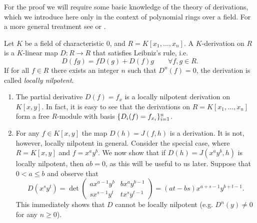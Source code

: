 \documentclass[a4paper,10pt]{amsart}
\begin{document}
For the proof we will require some basic knowledge of the theory of derivations, which we introduce here only in the context of polynomial rings over a field.
For a more general treatment see \autocite{vdE2000} or \autocite{Mat70}.

\begin{definition}[Derivation]
  Let \(K\) be a field of characteristic 0, and \(R=K[x_1,\ldots,x_n]\). A \(K\)-derivation on \(R\) is a \(K\)-linear map \(D\colon R\to R\) that satisfies Leibniz's rule, i.e.
  \[D(fg)=fD(g)+D(f)g\qquad\forall f,g\in R.\]
  If for all \(f\in R\) there exists an integer \(n\) such that \(D^n(f)=0\), the derivation is called \emph{locally nilpotent}.
\end{definition}
\begin{example}\label{ex:der}\hfill
  \begin{enumerate}
    \item The partial derivative \(D(f)=f_x\) is a locally nilpotent derivation on \(K[x,y]\). In fact, it is easy to see that the derivations on \(R=K[x_1,\ldots,x_n]\)
          form a free \(R\)-module with basis \(\{D_i(f)=f_{x_i}\}_{i=1}^n\).
    \item For any \(f\in K[x,y]\) the map \(D(h)=J(f,h)\) is a derivation. It is not, however, locally nilpotent in general. Consider the special case, where
          \(R=K[x,y]\) and \(f=x^ay^b\). We now show that if \(D(h)=J(x^ay^b,h)\) is locally nilpotent, then \(ab=0\), as this will be useful to us later.
          Suppose that \(0<a\le b\) and
          observe that
          \[D(x^sy^t)=\det
            \begin{pmatrix}
              ax^{a-1}y^b & bx^ay^{b-1} \\
              sx^{s-1}y^t & tx^sy^{t-1}
            \end{pmatrix}=(at-bs)x^{a+s-1}y^{b+t-1}.
          \]
          This immediately shows that \(D\) cannot be locally nilpotent (e.g. \(D^n(y)\ne 0\) for any \(n\ge 0\)).
  \end{enumerate}
\end{example}
\end{document}
